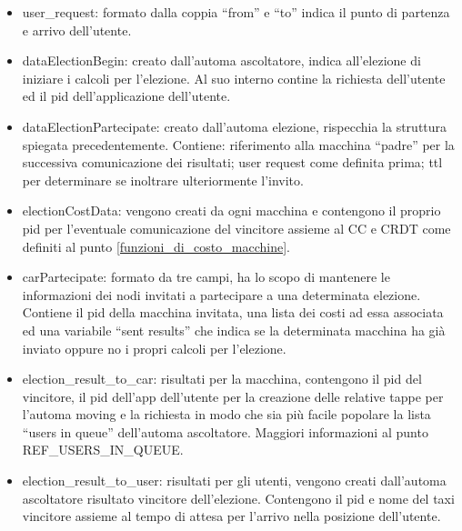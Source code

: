 \begin{itemize}
	\item user\_request: formato dalla coppia ``from''  e ``to'' indica il punto di partenza e arrivo dell'utente.
	\item dataElectionBegin: creato dall'automa ascoltatore, indica all'elezione di iniziare i calcoli per l'elezione. Al suo interno contine la richiesta dell'utente ed il pid dell'applicazione dell'utente.
	\item dataElectionPartecipate: creato dall'automa elezione, rispecchia la struttura spiegata precedentemente. Contiene: riferimento alla macchina ``padre'' per la successiva comunicazione dei risultati; user request come definita prima; ttl per determinare se inoltrare ulteriormente l'invito.
	\item electionCostData: vengono creati da ogni macchina e contengono il proprio pid per l'eventuale comunicazione del vincitore assieme al CC e CRDT come definiti al punto \ref{funzioni_di_costo_macchine}.
	\item carPartecipate: formato da tre campi, ha lo scopo di mantenere le informazioni dei nodi invitati a partecipare a una determinata elezione. Contiene il pid della macchina invitata, una lista dei costi ad essa associata ed una variabile ``sent results'' che indica se la determinata macchina ha già inviato oppure no i propri calcoli per l'elezione.
	\item election\_result\_to\_car: risultati per la macchina, contengono il pid del vincitore, il pid dell'app dell'utente per la creazione delle relative tappe per l'automa moving e la richiesta in modo che sia più facile popolare la lista ``users in queue'' dell'automa ascoltatore. Maggiori informazioni al punto REF\_USERS\_IN\_QUEUE.
	\item election\_result\_to\_user: risultati per gli utenti, vengono creati dall'automa ascoltatore risultato vincitore dell'elezione. Contengono il pid e nome del taxi vincitore assieme al tempo di attesa per l'arrivo nella posizione dell'utente.
\end{itemize}

